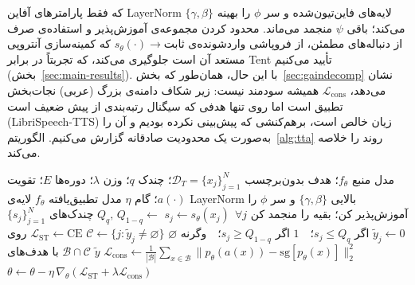 \documentclass[a4paper,11pt]{article}
\begin{document}
که فقط پارامترهای آفاین LayerNorm $\{\gamma,\beta\}$ لایه‌های فاین‌تیون‌شده
و سر $\phi$ را بهینه می‌کند؛ باقی $\psi$ منجمد می‌ماند. محدود کردن مجموعه‌ی
آموزش‌پذیر و استفاده‌ی صرف از دنباله‌های مطمئن، از فروپاشی واردشونده‌ی
$s_\theta(\cdot)\!\to\!\text{ثابت}$ که کمینه‌سازی آنتروپی مستعد آن است
جلوگیری می‌کند، که تجربتاً در برابر Tent تأیید می‌کنیم
(بخش~\ref{sec:main-results}). با این حال، همان‌طور که
بخش~\ref{sec:gaindecomp} نشان می‌دهد، $\mathcal{L}_{\mathrm{cons}}$ همیشه
سودمند نیست: زیر شکاف دامنه‌ی بزرگ (عربی) نجات‌بخش تطبیق است اما روی تنها
هدفی که سیگنال رتبه‌بندی از پیش ضعیف است (LibriSpeech-TTS) زیان خالص است،
برهم‌کنشی که پیش‌بینی نکرده بودیم و آن را به‌صورت یک محدودیت صادقانه گزارش
می‌کنیم. الگوریتم~\ref{alg:tta} روند را خلاصه می‌کند.

\begin{algorithm}[t]
\caption{تطبیق در زمان آزمون بر منیفلد واقعی (به‌ازای هر پیکره‌ی هدف)}
\label{alg:tta}
\begin{algorithmic}[1]
\Require مدل منبع $f_\theta$؛ هدف بدون‌برچسب $\mathcal{D}_T=\{x_j\}_{j=1}^{N}$؛
چندک $q$؛ وزن $\lambda$؛ دوره‌ها $E$؛ تقویت $a(\cdot)$؛ گام $\eta$
\Ensure مدل تطبیق‌یافته $f_\theta$
\State لایه‌ی LayerNorm بالایی $\{\gamma,\beta\}$ و سر $\phi$ را آموزش‌پذیر کن؛ بقیه را منجمد کن
  \State $s_j \gets s_\theta(x_j)\ \ \forall j$ 
  \State $Q_q,\,Q_{1-q}\gets$ چندک‌های $\{s_j\}_{j=1}^{N}$
  \State $\tilde y_j \gets 0$ اگر $s_j\!\le\!Q_q$؛\ \ $1$ اگر $s_j\!\ge\!Q_{1-q}$؛\ \ وگرنه $\varnothing$
  \State $\mathcal{C}\gets\{j:\tilde y_j\neq\varnothing\}$ 
    \State $\mathcal{L}_{\mathrm{ST}}\gets\mathrm{CE}$ روی $\mathcal{B}\cap\mathcal{C}$ با هدف‌های $\tilde y$ 
    \State $\mathcal{L}_{\mathrm{cons}}\gets\frac{1}{|\mathcal{B}|}\sum_{x\in\mathcal{B}}\|p_\theta(a(x))-\mathrm{sg}[p_\theta(x)]\|_2^2$
    \State $\theta\gets\theta-\eta\,\nabla_\theta(\mathcal{L}_{\mathrm{ST}}+\lambda\mathcal{L}_{\mathrm{cons}})$
  \EndFor
\EndFor
\end{algorithmic}
\end{algorithm}
\end{document}

